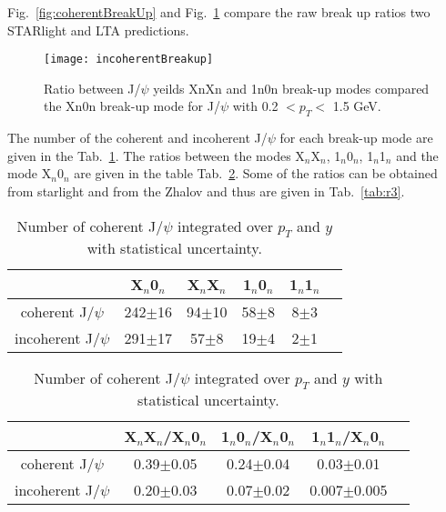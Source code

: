     Fig.~\ref{fig:coherentBreakUp} and Fig.~\ref{fig:incoherentBreakUp} compare
      the raw break up ratios two STARlight and LTA predictions. 
    \begin{figure}[!Hhtb]
      \centering
      \texttt{[image: incoherentBreakup]}
      \caption{Ratio between J/$\psi$ yeilds XnXn and 1n0n break-up modes 
        compared the Xn0n break-up mode for J/$\psi$ with 0.2 $< p_{T} <$ 
        1.5 GeV.}
      \label{fig:incoherentBreakUp}
    \end{figure}

    The number of the coherent and incoherent J/$\psi$ for each break-up mode are
      given in the Tab.~\ref{tab:r1}. 
    The ratios between the modes X$_{n}$X$_{n}$, 1$_{n}$0$_{n}$, 1$_{n}$1$_{n}$ and
      the mode  X$_{n}$0$_{n}$ are given in the table Tab.~\ref{tab:r2}. 
    Some of the  ratios can be obtained from  {\sc starlight} and from the Zhalov 
      and thus are given in Tab.~\ref{tab:r3}.
    \begin{table}[h]
      \begin{center}
      \begin{tabular}{|c|c|c|c|c|c|}
        \hline
         &  X$_{n}$0$_{n}$& X$_{n}$X$_{n}$ & 1$_{n}$0$_{n}$ & 1$_{n}$1$_{n}$  \\ \hline
        coherent J/$\psi$ &  242$\pm$16&94$\pm$10&58$\pm$8&8$\pm$3\\ \hline
        incoherent J/$\psi$ & 291$\pm$17&57$\pm$8&19$\pm$4&2$\pm$1\\ \hline
      \end{tabular}
      \caption{\label{tab:r1} Number of coherent J/$\psi$ integrated over $p_{T}$ and $y$ 
        with statistical uncertainty.}
      \end{center}
    \end{table}
    
    \begin{table}[h]
      \begin{center}
        \begin{tabular}{|c|c|c|c|c|}
          \hline
          & X$_{n}$X$_{n}$/X$_{n}$0$_{n}$ & 1$_{n}$0$_{n}$/X$_{n}$0$_{n}$ & 1$_{n}$1$_{n}$/X$_{n}$0$_{n}$  \\ \hline
          coherent J/$\psi$ &  0.39$\pm$0.05&0.24$\pm$0.04&0.03$\pm$0.01\\ \hline
          incoherent J/$\psi$ &  0.20$\pm$0.03&0.07$\pm$0.02&0.007$\pm$0.005 \\ \hline
        \end{tabular}
      \caption{\label{tab:r2} Number of coherent J/$\psi$ integrated over $p_{T}$ and $y$ 
        with statistical uncertainty.}
      \end{center}
    \end{table}

